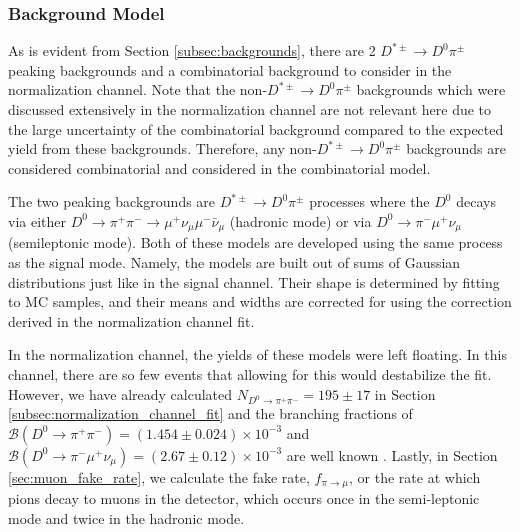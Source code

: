 \subsubsection{Background Model}

As is evident from Section \ref{subsec:backgrounds}, there are 2 $D^{*\pm} \to D^0 \pi^\pm$ peaking backgrounds and a combinatorial background to consider in the normalization channel. Note that the non-$D^{*\pm} \to D^0 \pi^\pm$ backgrounds which were discussed extensively in the normalization channel are not relevant here due to the large uncertainty of the combinatorial background compared to the expected yield from these backgrounds. Therefore, any non-$D^{*\pm} \to D^0 \pi^\pm$ backgrounds are considered combinatorial and considered in the combinatorial model.

The two peaking backgrounds are $D^{*\pm} \to D^0 \pi^\pm$ processes where the $D^0$ decays via either $D^0 \to \pi^+ \pi^- \to \mu^+ \nu_\mu \mu^- \bar{\nu}_\mu$ (hadronic mode) or via $D^0 \to \pi^- \mu^+ \nu_\mu$ (semileptonic mode). Both of these models are developed using the same process as the signal mode. Namely, the models are built out of sums of Gaussian distributions just like in the signal channel. Their shape is determined by fitting to MC samples, and their means and widths are corrected for using the correction derived in the normalization channel fit. 

In the normalization channel, the yields of these models were left floating. In this channel, there are so few events that allowing for this would destabilize the fit. However, we have already calculated $N_{D^0 \to \pi^+ \pi^-} = 195 \pm 17$ in Section \ref{subsec:normalization_channel_fit} and the branching fractions of $\mathcal{B}(D^0 \to \pi^+ \pi^-) = (1.454 \pm 0.024) \times 10^{-3}$ and $\mathcal{B}(D^0 \to \pi^-\mu^+ \nu_\mu) = (2.67 \pm 0.12) \times 10^{-3}$ are well known \cite{ref:pdg2024}. Lastly, in Section \ref{sec:muon_fake_rate}, we calculate the fake rate, $f_{\pi \to \mu}$, or the rate at which pions decay to muons in the detector, which occurs once in the semi-leptonic mode and twice in the hadronic mode.

